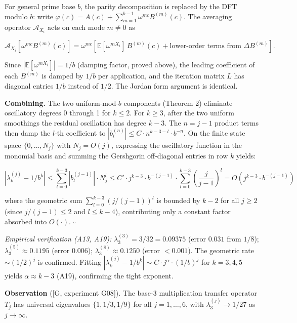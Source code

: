 \documentclass[
  11pt,
]{article}
\begin{document}
For general prime base \(b\), the parity decomposition is replaced by the DFT
modulo \(b\): write
\(\varphi(c) = A(c) + \sum_{m=1}^{b-1}\omega^{mc}B^{(m)}(c)\). The averaging
operator \(\mathcal{A}_{X_i}\) acts on each mode \(m \neq 0\) as

\[\mathcal{A}_{X_i}[\omega^{mc}B^{(m)}(c)] = \omega^{mc}[\mathbb{E}[\omega^{mX_i}]\,B^{(m)}(c) + \text{lower-order terms from } \Delta B^{(m)}].\]

Since \(|\mathbb{E}[\omega^{mX_i}]| = 1/b\) (damping factor, proved above), the
leading coefficient of each \(B^{(m)}\) is damped by \(1/b\) per application,
and the iteration matrix \(L\) has diagonal entries \(1/b\) instead of \(1/2\).
The Jordan form argument is identical.

\textbf{Combining.} The two uniform-mod-\(b\) components (Theorem 2) eliminate
oscillatory degrees 0 through 1 for \(k \leq 2\). For \(k \geq 3\), after the
two uniform smoothings the residual oscillation has degree \(k-3\). The
\(n = j-1\) product terms then damp the \(l\)-th coefficient to
\(|b_l^{(n)}| \leq C \cdot n^{k-3-l} \cdot b^{-n}\). On the finite state space
\(\lbrace{}0, \ldots, N_j\rbrace{}\) with \(N_j = O(j)\), expressing the
oscillatory function in the monomial basis and summing the Gershgorin
off-diagonal entries in row \(k\) yields:

\[|\lambda_k^{(j)} - 1/b^k| \leq \sum_{l=0}^{k-3} |b_l^{(j-1)}| \cdot N_j^l \leq C' \cdot j^{k-3} \cdot b^{-(j-1)} \cdot \sum_{l=0}^{k-3} \left(\frac{j}{j-1}\right)^l = O(j^{k-3} \cdot b^{-(j-1)})\]

where the geometric sum \(\sum_{l=0}^{k-3}(j/(j-1))^l\) is bounded by \(k-2\)
for all \(j \geq 2\) (since \(j/(j-1) \leq 2\) and \(l \leq k-4\)), contributing
only a constant factor absorbed into \(O(\cdot)\). \(\square\)

\emph{Empirical verification (A13, A19):} \(\lambda_3^{(3)} = 3/32 = 0.09375\)
(error \(0.031\) from \(1/8\)); \(\lambda_3^{(5)} \approx 0.1195\) (error
\(0.006\)); \(\lambda_3^{(8)} \approx 0.1250\) (error \(< 0.001\)). The
geometric rate \(\sim (1/2)^j\) is confirmed. Fitting
\(|\lambda_k^{(j)} - 1/b^k| \sim C \cdot j^\alpha \cdot (1/b)^j\) for
\(k = 3, 4, 5\) yields \(\alpha \approx k - 3\) (A19), confirming the tight
exponent.

\textbf{Observation} ({[}G, experiment G08{]}). The base-3 multiplication
transfer operator \(T_j\) has universal eigenvalues
\(\lbrace{}1, 1/3, 1/9\rbrace{}\) for all \(j = 1, \ldots, 6\), with
\(\lambda_3^{(j)} \to 1/27\) as \(j \to \infty\).
\end{document}
